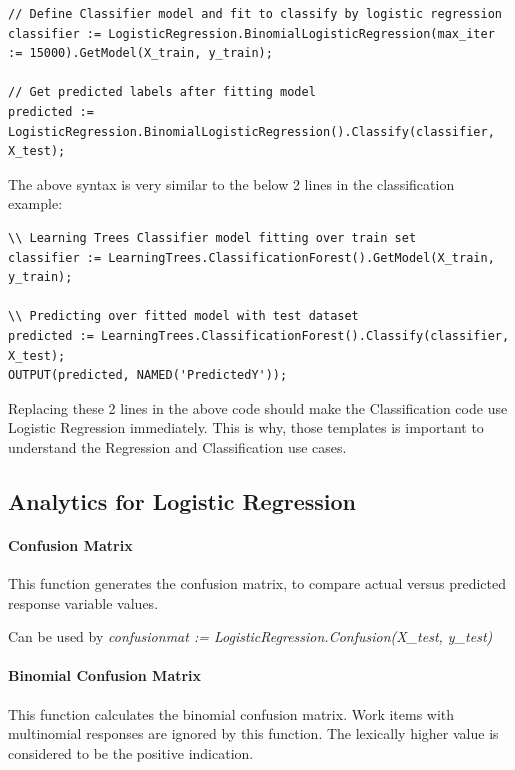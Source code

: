 \documentclass[a4paper,oneside,12pt]{book}
\begin{document}
\begin{lstlisting}
// Define Classifier model and fit to classify by logistic regression
classifier := LogisticRegression.BinomialLogisticRegression(max_iter := 15000).GetModel(X_train, y_train);

// Get predicted labels after fitting model
predicted := LogisticRegression.BinomialLogisticRegression().Classify(classifier, X_test);
\end{lstlisting}

The above syntax is very similar to the below 2 lines in the classification example:

\begin{lstlisting}
\\ Learning Trees Classifier model fitting over train set
classifier := LearningTrees.ClassificationForest().GetModel(X_train, y_train);

\\ Predicting over fitted model with test dataset
predicted := LearningTrees.ClassificationForest().Classify(classifier, X_test);
OUTPUT(predicted, NAMED('PredictedY'));
\end{lstlisting}

Replacing these 2 lines in the above code should make the Classification code use Logistic Regression immediately. This is why, those templates is important to understand the Regression and Classification use cases.

\subsection{Analytics for Logistic Regression}

\paragraph{Confusion Matrix}

This function generates the confusion matrix, to compare actual versus predicted response variable values.

Can be used by \textit{confusionmat := LogisticRegression.Confusion(X\_test, y\_test)}

\paragraph{Binomial Confusion Matrix}

This function calculates the binomial confusion matrix. Work items with multinomial responses are ignored by this function. The lexically higher value is considered to be the positive indication.
\end{document}
